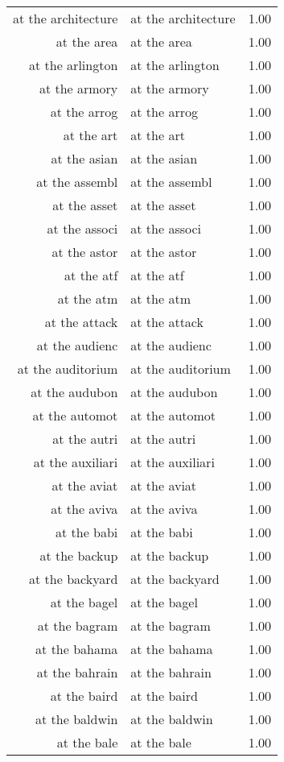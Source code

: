\begin{table}[ht]
\begin{tabular}{rlr}
  at the architecture & at the architecture & 1.00 \\ 
  at the area & at the area & 1.00 \\ 
  at the arlington & at the arlington & 1.00 \\ 
  at the armory & at the armory & 1.00 \\ 
  at the arrog & at the arrog & 1.00 \\ 
  at the art & at the art & 1.00 \\ 
  at the asian & at the asian & 1.00 \\ 
  at the assembl & at the assembl & 1.00 \\ 
  at the asset & at the asset & 1.00 \\ 
  at the associ & at the associ & 1.00 \\ 
  at the astor & at the astor & 1.00 \\ 
  at the atf & at the atf & 1.00 \\ 
  at the atm & at the atm & 1.00 \\ 
  at the attack & at the attack & 1.00 \\ 
  at the audienc & at the audienc & 1.00 \\ 
  at the auditorium & at the auditorium & 1.00 \\ 
  at the audubon & at the audubon & 1.00 \\ 
  at the automot & at the automot & 1.00 \\ 
  at the autri & at the autri & 1.00 \\ 
  at the auxiliari & at the auxiliari & 1.00 \\ 
  at the aviat & at the aviat & 1.00 \\ 
  at the aviva & at the aviva & 1.00 \\ 
  at the babi & at the babi & 1.00 \\ 
  at the backup & at the backup & 1.00 \\ 
  at the backyard & at the backyard & 1.00 \\ 
  at the bagel & at the bagel & 1.00 \\ 
  at the bagram & at the bagram & 1.00 \\ 
  at the bahama & at the bahama & 1.00 \\ 
  at the bahrain & at the bahrain & 1.00 \\ 
  at the baird & at the baird & 1.00 \\ 
  at the baldwin & at the baldwin & 1.00 \\ 
  at the bale & at the bale & 1.00 \\ 

\end{tabular}
\end{table}
